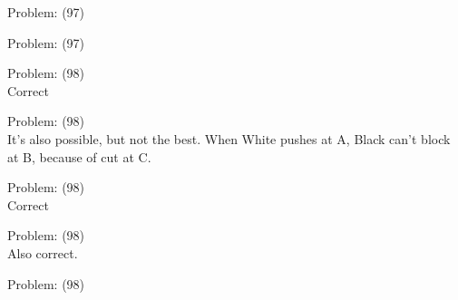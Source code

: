 \documentclass[11pt]{article}
\begin{document}
\begin{minipage}[t]{0.5\textwidth}
  {\centering
  
  Problem: (97)\\
  
  }
\end{minipage}
\begin{minipage}[t]{0.5\textwidth}
  {\centering
  
  Problem: (97)\\
  
  }
\end{minipage}
\begin{minipage}[t]{0.5\textwidth}
  {\centering
  
  Problem: (98)\\
  Correct\\
  }
\end{minipage}
\begin{minipage}[t]{0.5\textwidth}
  {\centering
  
  Problem: (98)\\
  It's also possible, but not the best. When White pushes at A, Black can't block at B, because of cut at C.\\
  }
\end{minipage}
\begin{minipage}[t]{0.5\textwidth}
  {\centering
  
  Problem: (98)\\
  Correct\\
  }
\end{minipage}
\begin{minipage}[t]{0.5\textwidth}
  {\centering
  
  Problem: (98)\\
  Also correct.\\
  }
\end{minipage}
\begin{minipage}[t]{0.5\textwidth}
  {\centering
  
  Problem: (98)\\
  
  }
\end{minipage}
\end{document}
